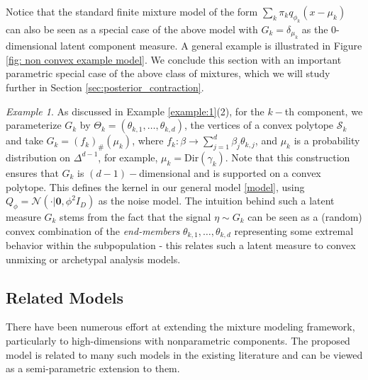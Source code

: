 \documentclass[bj,authoryear]{imsart}
\theoremstyle{plain}
\theoremstyle{remark}
\newtheorem{example}{Example}
\def\cN{\mathcal{N}}
\def\cS{\mathcal{S}}
\begin{document}
Notice that the standard finite mixture model of the form $\sum_k \pi_k q_{\phi_k}(x-\mu_k)$ can also be seen as a special case of the above model with $G_k=\delta_{\mu_k}$ as the 0-dimensional latent component measure. A general example is illustrated in Figure \ref{fig: non convex example model}. We conclude this section with an important parametric special case of the above class of mixtures, which we will study further in Section \ref{sec:posterior_contraction}.
\begin{example}\label{example:polytope}
    As discussed in Example \ref{example:1}(2), for the $k-$th component, we parameterize $G_k$ by $\Theta_k=(\theta_{k,1},\dots,\theta_{k,d})$, the vertices of a convex polytope $\cS_k$ and take $G_k=(f_k)_{\#} (\mu_k)$, where $f_k:\beta\to \sum_{j=1}^d \beta_j\theta_{k,j}$, and $\mu_k$ is a probability distribution on $\Delta^{d-1}$, for example, $\mu_k=\text{Dir}(\gamma_k)$. Note that this construction ensures that $G_k$ is $(d-1)-$dimensional and is supported on a convex polytope. This defines the kernel in our general model \ref{model}, using $Q_{\phi}=\cN(\cdot|\boldsymbol{0}, \phi^2 I_D)$ as the noise model. The intuition behind such a latent measure $G_k$ stems from the fact that the signal $\eta\sim G_k$ can be seen as a (random) convex combination of the \textit{end-members} $\theta_{k,1},\dots,\theta_{k,d}$ representing some extremal behavior within the subpopulation - this relates such a latent measure to convex unmixing or archetypal analysis models.
\end{example}

\subsection{Related Models}\label{sec:related models}
There have been numerous effort at extending the mixture modeling framework, particularly to high-dimensions with nonparametric components. The proposed model is related to many such models in the existing literature and can be viewed as a semi-parametric extension to them.
\end{document}
